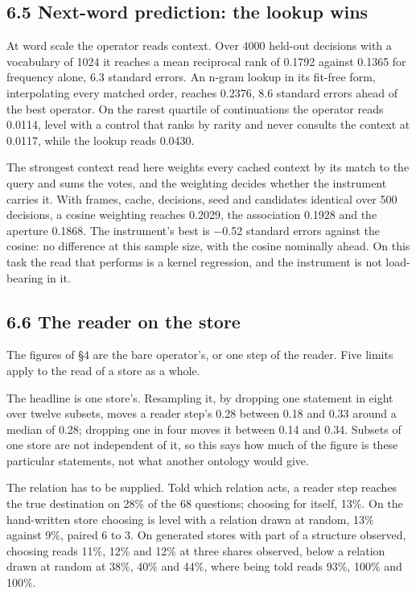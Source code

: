 \documentclass[10pt,letterpaper,twocolumn]{article}
\begin{document}
\subsection{6.5 Next-word prediction: the lookup wins}\label{65-next-word-prediction-the-lookup-wins}

At word scale the operator reads context. Over 4000 held-out decisions with a vocabulary of 1024 it
reaches a mean reciprocal rank of 0.1792 against 0.1365 for frequency alone, 6.3 standard errors.
An n-gram lookup in its fit-free form, interpolating every matched order, reaches 0.2376, 8.6 standard
errors ahead of the best operator. On the rarest quartile of continuations the operator reads 0.0114,
level with a control that ranks by rarity and never consults the context at 0.0117, while the lookup
reads 0.0430.

The strongest context read here weights every cached context by its match to the query and sums the
votes, and the weighting decides whether the instrument carries it. With frames, cache, decisions,
seed and candidates identical over 500 decisions, a cosine weighting reaches 0.2029, the association
0.1928 and the aperture 0.1868. The instrument's best is −0.52 standard errors against the cosine: no
difference at this sample size, with the cosine nominally ahead. On this task the read that performs
is a kernel regression, and the instrument is not load-bearing in it.

\subsection{6.6 The reader on the store}\label{66-the-reader-on-the-store}

The figures of §4 are the bare operator's, or one step of the reader. Five limits apply to the read
of a store as a whole.

The headline is one store's. Resampling it, by dropping one statement in eight over twelve subsets,
moves a reader step's 0.28 between 0.18 and 0.33 around a median of 0.28; dropping one in four moves
it between 0.14 and 0.34. Subsets of one store are not independent of it, so this says how much of
the figure is these particular statements, not what another ontology would give.

The relation has to be supplied. Told which relation acts, a reader step reaches the true destination
on 28\% of the 68 questions; choosing for itself, 13\%. On the hand-written store choosing is level with
a relation drawn at random, 13\% against 9\%, paired 6 to 3. On generated stores with part of a
structure observed, choosing reads 11\%, 12\% and 12\% at three shares observed, below a relation drawn
at random at 38\%, 40\% and 44\%, where being told reads 93\%, 100\% and 100\%.
\end{document}
